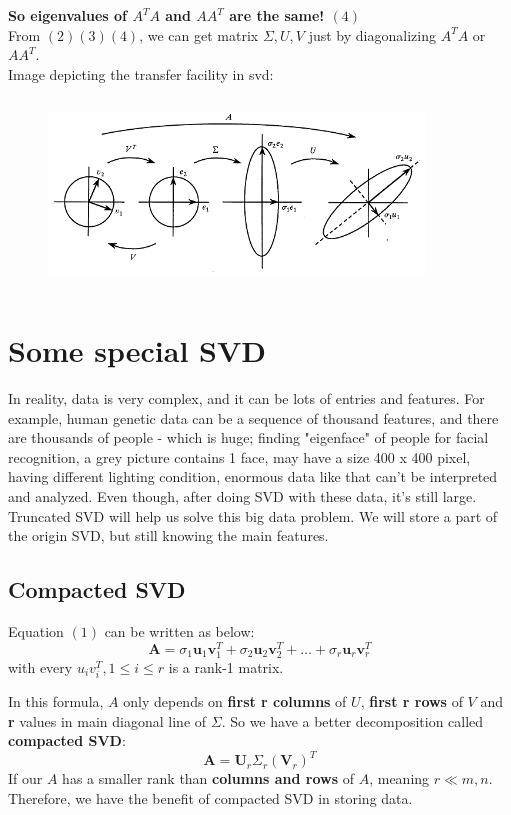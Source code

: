 \documentclass[a4paper, 12pt]{report}
\begin{document}
\textbf{So eigenvalues of $A^T A$ and $A A^T$ are the same! $(4)$}\\
From $(2)(3)(4)$, we can get matrix $\Sigma, U , V$ just by diagonalizing $A^TA$ or $AA^T$.\\
Image depicting the transfer facility in svd:
\begin{figure}[H]
    \center
    \includegraphics[width=10cm,height=5cm]{svdcs.png}
\end{figure}

\section{Some special SVD}
\indent \par In reality, data is very complex, and it can be lots of entries and features. For example, human genetic data can be a sequence of thousand features, and there are thousands of people - which is huge; finding "eigenface" of people for facial recognition, a grey picture contains 1 face, may have a size 400 x 400 pixel, having different lighting condition, enormous data like that can't be interpreted and analyzed. Even though, after doing SVD with these data, it's still large. Truncated SVD will help us solve this big data problem. We will store a part of the origin SVD, but still knowing the main features.
\subsection{Compacted SVD}
\indent\par Equation $(1)$ can be written as below:
  $$ \mathbf{A} = \sigma_1 \mathbf{u}_1 \mathbf{v}^T_1 + \sigma_2\mathbf{u}_2\mathbf{v}_2^T + \dots + \sigma_r\mathbf{u}_r\mathbf{v}_r^T $$
\indent with every $u_i v_i^T, 1 \leq i \leq r$ is a rank-1 matrix.\\
\indent \par In this formula, $A$ only depends on \textbf{first r columns} of $U$, \textbf{first r rows} of $V$ and \textbf{r} values in main diagonal line of $\Sigma$. So we have a better decomposition called \textbf{compacted SVD}:
$$ \mathbf{A} = {\mathbf{U}}_r{\Sigma}_r({\mathbf{V}}_r)^T $$
If our $A$ has a smaller rank than \textbf{columns and rows} of $A$, meaning $ r \ll m,n$. Therefore, we have the benefit of compacted SVD in storing data.
\end{document}
